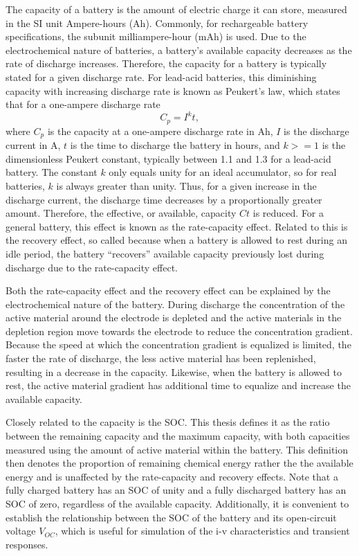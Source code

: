 The capacity of a battery is the amount of electric charge it can store, measured in the SI unit Ampere-hours (Ah). Commonly, for rechargeable battery specifications, the subunit milliampere-hour (mAh) is used. Due to the electrochemical nature of batteries, a battery's available capacity decreases as the rate of discharge increases. Therefore, the capacity for a battery is typically stated for a given discharge rate. For lead-acid batteries, this diminishing capacity with increasing discharge rate is known as Peukert's law, which states that for a one-ampere discharge rate\cite{doerffel06}
\begin{equation}
C_p = I^k t,
\end{equation}
where $C_p$ is the capacity at a one-ampere discharge rate in Ah, $I$ is the discharge current in A, $t$ is the time to discharge the battery in hours, and $k>=1$ is the dimensionless Peukert constant, typically between 1.1 and 1.3 for a lead-acid battery. The constant $k$ only equals unity for an ideal accumulator, so for real batteries, $k$ is always greater than unity. Thus, for a given increase in the discharge current, the discharge time decreases by a proportionally greater amount. Therefore, the effective, or available, capacity $Ct$ is reduced. For a general battery, this effect is known as the rate-capacity effect. Related to this is the recovery effect, so called because when a battery is allowed to rest during an idle period, the battery ``recovers'' available capacity previously lost during discharge due to the rate-capacity effect.

Both the rate-capacity effect and the recovery effect can be explained by the electrochemical nature of the battery. During discharge the concentration of the active material around the electrode is depleted and the active materials in the depletion region move towards the electrode to reduce the concentration gradient\cite{chiasserini99}. Because the speed at which the concentration gradient is equalized is limited, the faster the rate of discharge, the less active material has been replenished, resulting in a decrease in the capacity. Likewise, when the battery is allowed to rest, the active material gradient has additional time to equalize and increase the available capacity.

Closely related to the capacity is the SOC. This thesis defines it as the ratio between the remaining capacity and the maximum capacity, with both capacities measured using the amount of active material within the battery. This definition then denotes the proportion of remaining chemical energy rather the the available energy and is unaffected by the rate-capacity and recovery effects. Note that a fully charged battery has an SOC of unity and a fully discharged battery has an SOC of zero, regardless of the available capacity. Additionally, it is convenient to establish the relationship between the SOC of the battery and its open-circuit voltage $V_{OC}$, which is useful for simulation of the i-v characteristics and transient responses.

